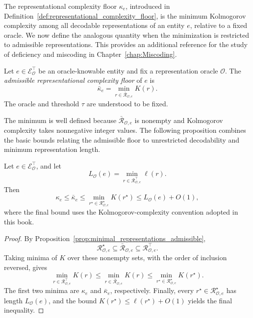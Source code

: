The representational complexity floor $\kappa_e$, introduced in Definition~\ref{def:representational_complexity_floor}, is the minimum Kolmogorov complexity among all decodable representations of an entity $e$, relative to a fixed oracle. We now define the analogous quantity when the minimization is restricted to admissible representations. This provides an additional reference for the study of deficiency and miscoding in Chapter~\ref{chap:Miscoding}.

\begin{definition}
\label{def:admissible_complexity_floor}
Let $e\in\mathcal E^\top_{\mathcal O}$ be an oracle-knowable entity and fix a representation oracle $\mathcal O$. The \emph{admissible representational complexity floor} of $e$ is
\[
\bar\kappa_e = \min_{r\in\bar{\mathcal R}_{\mathcal O,e}}K(r).
\]
The oracle and threshold $\tau$ are understood to be fixed.
\end{definition}

The minimum is well defined because $\bar{\mathcal R}_{\mathcal O,e}$ is nonempty and Kolmogorov complexity takes nonnegative integer values. The following proposition combines the basic bounds relating the admissible floor to unrestricted decodability and minimum representation length.

\begin{proposition}
\label{prop:complexity_floors_order}
Let $e\in\mathcal E^\top_{\mathcal O}$, and let
\[
L_{\mathcal O}(e)
=
\min_{r\in\mathcal R^\top_{\mathcal O,e}}\ell(r).
\]
Then
\[
\kappa_e
\leq
\bar\kappa_e
\leq
\min_{r^\star\in\mathcal R^\star_{\mathcal O,e}}K(r^\star)
\leq
L_{\mathcal O}(e)+O(1),
\]
where the final bound uses the Kolmogorov-complexity convention adopted in this book.
\end{proposition}

\begin{proof}
By Proposition~\ref{prop:minimal_representations_admissible},
\[
\mathcal R^\star_{\mathcal O,e}
\subseteq
\bar{\mathcal R}_{\mathcal O,e}
\subseteq
\mathcal R^\top_{\mathcal O,e}.
\]
Taking minima of $K$ over these nonempty sets, with the order of inclusion reversed, gives
\[
\min_{r\in\mathcal R^\top_{\mathcal O,e}}K(r)
\leq
\min_{r\in\bar{\mathcal R}_{\mathcal O,e}}K(r)
\leq
\min_{r^\star\in\mathcal R^\star_{\mathcal O,e}}K(r^\star).
\]
The first two minima are $\kappa_e$ and $\bar\kappa_e$, respectively. Finally, every $r^\star\in\mathcal R^\star_{\mathcal O,e}$ has length $L_{\mathcal O}(e)$, and the bound $K(r^\star)\leq\ell(r^\star)+O(1)$ yields the final inequality.
\end{proof}


